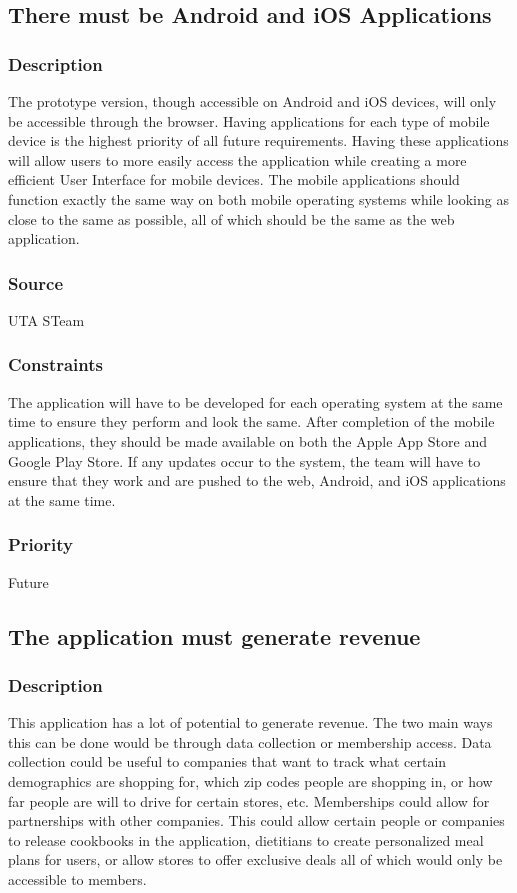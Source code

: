 \subsection{There must be Android and iOS Applications}
\subsubsection{Description}
The prototype version, though accessible on Android and iOS devices, will only be accessible through the browser. Having applications for each type of mobile device is the highest priority of all future requirements. Having these applications will allow users to more easily access the application while creating a more efficient User Interface for mobile devices. The mobile applications should function exactly the same way on both mobile operating systems while looking as close to the same as possible, all of which should be the same as the web application.
\subsubsection{Source}
UTA STeam
\subsubsection{Constraints}
The application will have to be developed for each operating system at the same time to ensure they perform and look the same. After completion of the mobile applications, they should be made available on both the Apple App Store and Google Play Store. If any updates occur to the system, the team will have to ensure that they work and are pushed to the web, Android, and iOS applications at the same time.
\subsubsection{Priority}
Future

\subsection{The application must generate revenue}
\subsubsection{Description}
This application has a lot of potential to generate revenue. The two main ways this can be done would be through data collection or membership access. Data collection could be useful to companies that want to track what certain demographics are shopping for, which zip codes people are shopping in, or how far people are will to drive for certain stores, etc. Memberships could allow for partnerships with other companies. This could allow certain people or companies to release cookbooks in the application, dietitians to create personalized meal plans for users, or allow stores to offer exclusive deals all of which would only be accessible to members.
